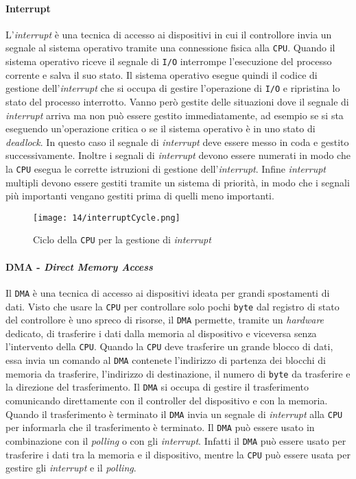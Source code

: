         \paragraph{Interrupt}
            L'\textit{interrupt} è una tecnica di accesso ai dispositivi in cui il controllore invia un segnale al sistema operativo tramite una connessione fisica alla \texttt{CPU}. Quando il sistema operativo riceve il segnale di \texttt{I/O} interrompe l'esecuzione del processo corrente e salva il suo stato. Il sistema operativo esegue quindi il codice di gestione dell'\textit{interrupt} che si occupa di gestire l'operazione di \texttt{I/O} e ripristina lo stato del processo interrotto. Vanno però gestite delle situazioni dove il segnale di \textit{interrupt} arriva ma non può essere gestito immediatamente, ad esempio se si sta eseguendo un'operazione critica o se il sistema operativo è in uno stato di \textit{deadlock}. In questo caso il segnale di \textit{interrupt} deve essere messo in coda e gestito successivamente. Inoltre i segnali di \textit{interrupt} devono essere numerati in modo che la \texttt{CPU} esegua le corrette istruzioni di gestione dell'\textit{interrupt}. Infine \textit{interrupt} multipli devono essere gestiti tramite un sistema di priorità, in modo che i segnali più importanti vengano gestiti prima di quelli meno importanti.
            \begin{figure}[H]
                \centering
                \texttt{[image: 14/interruptCycle.png]}
                \caption{Ciclo della \texttt{CPU} per la gestione di \textit{interrupt}}
            \end{figure}
        \paragraph{DMA - \textit{Direct Memory Access}}
            Il \texttt{DMA} è una tecnica di accesso ai dispositivi ideata per grandi spostamenti di dati. Visto che usare la \texttt{CPU} per controllare solo pochi \texttt{byte} dal registro di stato del controllore è uno spreco di risorse, il \texttt{DMA} permette, tramite un \textit{hardware} dedicato, di trasferire i dati dalla memoria al dispositivo e viceversa senza l'intervento della \texttt{CPU}. Quando la \texttt{CPU} deve trasferire un grande blocco di dati, essa invia un comando al \texttt{DMA} contenete l'indirizzo di partenza dei blocchi di memoria da trasferire, l'indirizzo di destinazione, il numero di \texttt{byte} da trasferire e la direzione del trasferimento. Il \texttt{DMA} si occupa di gestire il trasferimento comunicando direttamente con il controller del dispositivo e con la memoria. Quando il trasferimento è terminato il \texttt{DMA} invia un segnale di \textit{interrupt} alla \texttt{CPU} per informarla che il trasferimento è terminato. Il \texttt{DMA} può essere usato in combinazione con il \textit{polling} o con gli \textit{interrupt}. Infatti il \texttt{DMA} può essere usato per trasferire i dati tra la memoria e il dispositivo, mentre la \texttt{CPU} può essere usata per gestire gli \textit{interrupt} e il \textit{polling}.
